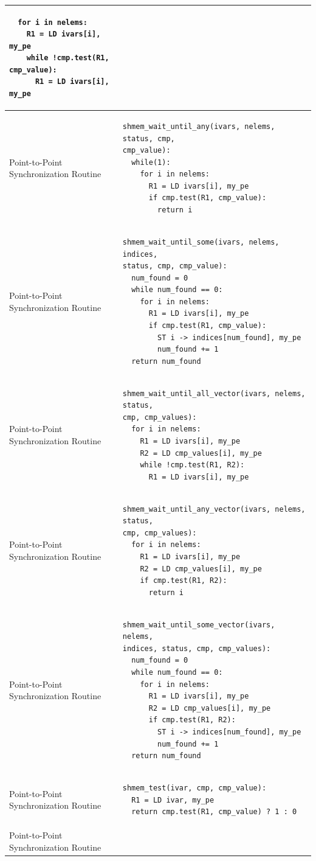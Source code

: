 \begin{longtable}{|m{}|m{}|}
\begin{BVerbatim}
  for i in nelems:
    R1 = LD ivars[i], my_pe
    while !cmp.test(R1, cmp_value):
      R1 = LD ivars[i], my_pe
    \end{BVerbatim}
    \tabularnewline\hline
Point-to-Point Synchronization Routine
    & \begin{BVerbatim}
shmem_wait_until_any(ivars, nelems, status, cmp,
cmp_value):
  while(1):
    for i in nelems:
      R1 = LD ivars[i], my_pe
      if cmp.test(R1, cmp_value):
        return i
    \end{BVerbatim}
    \tabularnewline\hline
Point-to-Point Synchronization Routine
    & \begin{BVerbatim}
shmem_wait_until_some(ivars, nelems, indices,
status, cmp, cmp_value):
  num_found = 0
  while num_found == 0:
    for i in nelems:
      R1 = LD ivars[i], my_pe
      if cmp.test(R1, cmp_value):
        ST i -> indices[num_found], my_pe
        num_found += 1
  return num_found
    \end{BVerbatim}
    \tabularnewline\hline
Point-to-Point Synchronization Routine
    & \begin{BVerbatim}
shmem_wait_until_all_vector(ivars, nelems, status,
cmp, cmp_values):
  for i in nelems:
    R1 = LD ivars[i], my_pe
    R2 = LD cmp_values[i], my_pe
    while !cmp.test(R1, R2):
      R1 = LD ivars[i], my_pe
    \end{BVerbatim}
    \tabularnewline\hline
Point-to-Point Synchronization Routine
    & \begin{BVerbatim}
shmem_wait_until_any_vector(ivars, nelems, status,
cmp, cmp_values):
  for i in nelems:
    R1 = LD ivars[i], my_pe
    R2 = LD cmp_values[i], my_pe
    if cmp.test(R1, R2):
      return i
    \end{BVerbatim}
    \tabularnewline\hline
Point-to-Point Synchronization Routine
    & \begin{BVerbatim}
shmem_wait_until_some_vector(ivars, nelems,
indices, status, cmp, cmp_values):
  num_found = 0
  while num_found == 0:
    for i in nelems:
      R1 = LD ivars[i], my_pe
      R2 = LD cmp_values[i], my_pe
      if cmp.test(R1, R2):
        ST i -> indices[num_found], my_pe
        num_found += 1
  return num_found
    \end{BVerbatim}
    \tabularnewline\hline
Point-to-Point Synchronization Routine
    & \begin{BVerbatim}
shmem_test(ivar, cmp, cmp_value):
  R1 = LD ivar, my_pe
  return cmp.test(R1, cmp_value) ? 1 : 0
    \end{BVerbatim}
    \tabularnewline\hline
Point-to-Point Synchronization Routine

\end{longtable}
